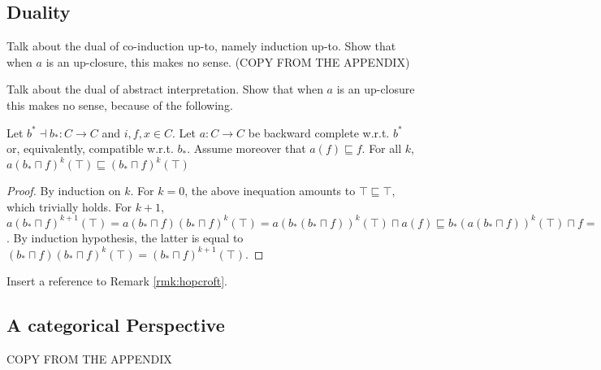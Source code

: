 \documentclass{llncs}
\begin{document}

\subsection{Duality}

Talk about the dual of co-induction up-to, namely induction up-to. Show that when $a$ is an up-closure, this makes no sense. (COPY FROM THE APPENDIX)

Talk about the dual of abstract interpretation. Show that when $a$ is an up-closure this makes no sense, because of the following.
%
\begin{proposition}
Let $b^* \dashv b_* \colon C \to C$ and $i,f,x\in C$. Let $a\colon C\to C$ be backward complete w.r.t. $b^*$ or, equivalently, compatible w.r.t. $b_*$. Assume moreover that $a(f)\sqsubseteq f$. For all $k$, $a(b_*\sqcap f)^k(\top) \sqsubseteq (b_*\sqcap f)^k(\top)$
\end{proposition}
\begin{proof}
By induction on $k$. For $k=0$, the above inequation amounts to  $\top \sqsubseteq \top$, which trivially holds.
For $k+1$, $a(b_*\sqcap f)^{k+1}(\top)=a(b_*\sqcap f)(b_*\sqcap f)^k(\top) = a(b_*(b_*\sqcap f))^k(\top) \sqcap a(f) \sqsubseteq b_*(a(b_*\sqcap f))^k(\top) \sqcap f = (b_*\sqcap f)(a(b_*\sqcap f))^k(\top)$. By induction hypothesis, the latter is equal to $(b_*\sqcap f)(b_*\sqcap f)^k(\top)=(b_*\sqcap f)^{k+1}(\top)$.
\end{proof}

Insert a reference to Remark \ref{rmk:hopcroft}.

\subsection{A categorical Perspective}
COPY FROM THE APPENDIX
\end{document}
